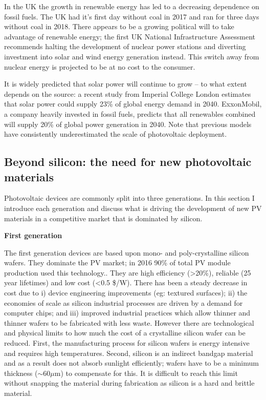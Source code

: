 In the UK the growth in renewable energy has led to a decreasing dependence on fossil fuels. The UK had it's first day without coal in 2017\autocite{Brown2017} and ran for three days without coal in 2018.\autocite{Vaughan2018} There appears to be a growing political will to take advantage of renewable energy; the first UK National Infrastructure Assessment recommends halting the development of nuclear power stations and diverting investment into solar and wind energy generation instead.\autocite{NIA2018} This switch away from nuclear energy is projected to be at no cost to the consumer.

It is widely predicted that solar power will continue to grow -- to what extent depends on the source: a recent study from Imperial College London estimates that solar power could supply 23\% of global energy demand in 2040.\autocite{Grantham2017} ExxonMobil, a company heavily invested in fossil fuels, predicts that all renewables combined will supply 20\% of global power generation in 2040.\autocite{exxon2018} Note that previous models have consistently underestimated the scale of photovoltaic deployment.\autocite{Creutzig2017}

\subsection{Beyond silicon: the need for new photovoltaic materials}

Photovoltaic devices are commonly split into three generations. In this section I introduce each generation and discuss what is driving the development of new PV materials in a competitive market that is dominated by silicon.

\newline
\textbf{First generation}\newline

The first generation devices are based upon mono- and poly-crystalline silicon wafers. They dominate the PV market; in 2016 90\% of total PV module production used this technology.\autocite{Jager-Waldau2017}. They are high efficiency (>20\%), reliable (25 year lifetimes) and low cost (<0.5 \$/W). There has been a steady decrease in cost due to i) device engineering improvements (eg: textured surfaces); ii) the economies of scale as silicon industrial processes are driven by a demand for computer chips; and iii) improved industrial practices which allow thinner and thinner wafers to be fabricated with less waste. However there are technological and physical limits to how much the cost of a crystalline silicon wafer can be reduced. First, the manufacturing process for silicon wafers is energy intensive and requires high temperatures. Second, silicon is an indirect bandgap material and as a result does not absorb sunlight efficiently; wafers have to be a minimum thickness ($\sim 60\mu \textrm{m}$) to compensate for this. It is difficult to reach this limit without snapping the material during fabrication as silicon is a hard and brittle material.


